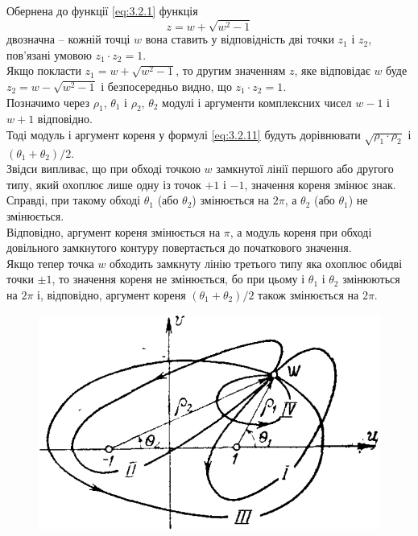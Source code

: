 Обернена до функції \eqref{eq:3.2.1} функція
\begin{equation}
	\label{eq:3.2.11}
	z = w + \sqrt{w^2 - 1}
\end{equation}
двозначна -- кожній точці $w$ вона ставить у відповідність дві точки $z_1$ і $z_2$, пов'язані умовою $z_1 \cdot z_2 = 1$. \\

Якщо покласти $z_1 = w + \sqrt{w^2 - 1}$, то другим значенням $z$, яке відповідає $w$ буде $z_2 = w - \sqrt{w^2 - 1}$ і безпосередньо видно, що $z_1 \cdot z_2 = 1$. \\

Позначимо через $\rho_1$, $\theta_1$ і $\rho_2$, $\theta_2$ модулі і аргументи комплексних чисел $w - 1$ і $w + 1$ відповідно. \\

Тоді модуль і аргумент кореня у формулі \eqref{eq:3.2.11} будуть дорівнювати $\sqrt{\rho_1 \cdot \rho_2}$ і $(\theta_1 + \theta_2) / 2$. \\

Звідси випливає, що при обході точкою $w$ замкнутої лінії першого або другого типу, який охоплює лише одну із точок $+1$ і $-1$, значення кореня змінює знак. \\

Справді, при такому обході $\theta_1$ (або $\theta_2$) змінюється на $2 \pi$, а $\theta_2$ (або $\theta_1$) не змінюється. \\

Відповідно, аргумент кореня змінюється на $\pi$, а модуль кореня при обході довільного замкнутого контуру повертається до початкового значення. \\

Якщо тепер точка $w$ обходить замкнуту лінію третього типу яка охоплює обидві точки $\pm1$, то значення кореня не змінюється, бо при цьому і $\theta_1$ і $\theta_2$ змінюються на $2 \pi$ і, відповідно, аргумент кореня $(\theta_1 + \theta_2) / 2$ також змінюється на $2 \pi$.
\begin{figure}[H]
	\centering
	\includegraphics[width=.6\linewidth]{mal-12.png}
\end{figure}

